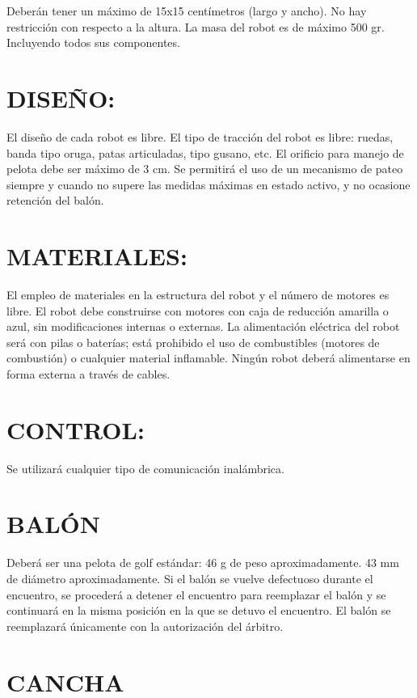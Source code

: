 \documentclass[
  letterpaper,
  DIV=11,
  numbers=noendperiod]{scrreprt}
\begin{document}
Deberán tener un máximo de 15x15 centímetros (largo y ancho). No hay
restricción con respecto a la altura. La masa del robot es de máximo 500
gr. Incluyendo todos sus componentes.

\section{DISEÑO:}\label{diseuxf1o}

El diseño de cada robot es libre. El tipo de tracción del robot es
libre: ruedas, banda tipo oruga, patas articuladas, tipo gusano, etc. El
orificio para manejo de pelota debe ser máximo de 3 cm. Se permitirá el
uso de un mecanismo de pateo siempre y cuando no supere las medidas
máximas en estado activo, y no ocasione retención del balón.

\section{MATERIALES:}\label{materiales}

El empleo de materiales en la estructura del robot y el número de
motores es libre. El robot debe construirse con motores con caja de
reducción amarilla o azul, sin modificaciones internas o externas. La
alimentación eléctrica del robot será con pilas o baterías; está
prohibido el uso de combustibles (motores de combustión) o cualquier
material inflamable. Ningún robot deberá alimentarse en forma externa a
través de cables.

\section{CONTROL:}\label{control}

Se utilizará cualquier tipo de comunicación inalámbrica.

\section{BALÓN}\label{baluxf3n}

Deberá ser una pelota de golf estándar: 46 g de peso aproximadamente. 43
mm de diámetro aproximadamente. Si el balón se vuelve defectuoso durante
el encuentro, se procederá a detener el encuentro para reemplazar el
balón y se continuará en la misma posición en la que se detuvo el
encuentro. El balón se reemplazará únicamente con la autorización del
árbitro.

\section{CANCHA}\label{cancha}
\end{document}

